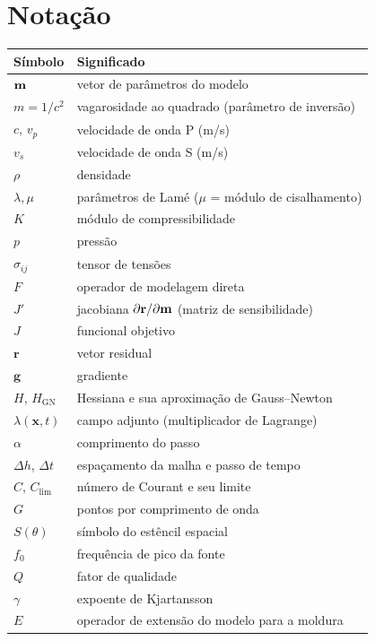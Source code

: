 \documentclass[11pt,a4paper,oneside]{report}
\begin{document}
\appendix

\chapter{Nota\c{c}\~ao}

\begin{center}
\begin{longtable}{@{}ll@{}}
\toprule
\textbf{S\'imbolo} & \textbf{Significado} \\
\midrule
\endhead
$\mathbf{m}$ & vetor de par\^ametros do modelo \\
$m = 1/c^{2}$ & vagarosidade ao quadrado (par\^ametro de invers\~ao) \\
$c$, $v_p$ & velocidade de onda P (m/s) \\
$v_s$ & velocidade de onda S (m/s) \\
$\rho$ & densidade \\
$\lambda, \mu$ & par\^ametros de Lam\'e ($\mu$ = m\'odulo de cisalhamento) \\
$K$ & m\'odulo de compressibilidade \\
$p$ & press\~ao \\
$\sigma_{ij}$ & tensor de tens\~oes \\
$F$ & operador de modelagem direta \\
$J'$ & jacobiana $\partial\mathbf{r}/\partial\mathbf{m}$ (matriz de sensibilidade) \\
$J$ & funcional objetivo \\
$\mathbf{r}$ & vetor residual \\
$\mathbf{g}$ & gradiente \\
$H$, $H_{\text{GN}}$ & Hessiana e sua aproxima\c{c}\~ao de Gauss--Newton \\
$\lambda(\mathbf{x},t)$ & campo adjunto (multiplicador de Lagrange) \\
$\alpha$ & comprimento do passo \\
$\Delta h$, $\Delta t$ & espa\c{c}amento da malha e passo de tempo \\
$C$, $C_{\lim}$ & n\'umero de Courant e seu limite \\
$G$ & pontos por comprimento de onda \\
$S(\theta)$ & s\'imbolo do est\^encil espacial \\
$f_0$ & frequ\^encia de pico da fonte \\
$Q$ & fator de qualidade \\
$\gamma$ & expoente de Kjartansson \\
$E$ & operador de extens\~ao do modelo para a moldura \\
\bottomrule
\end{longtable}
\end{center}
\end{document}
